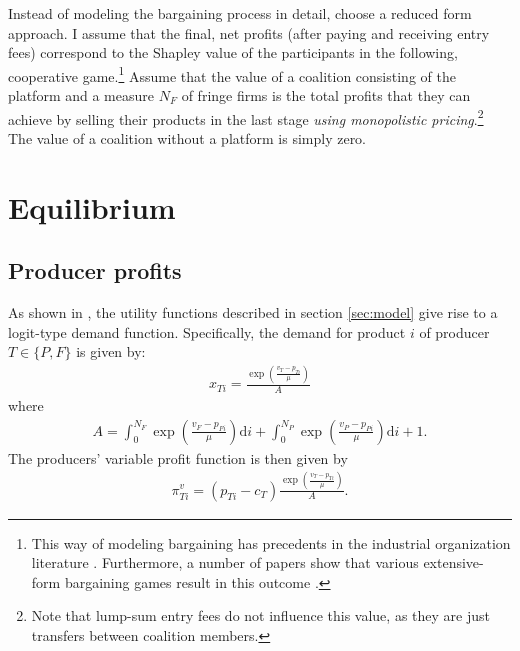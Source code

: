 \documentclass[a4paper]{article}
\newcommand{\di}{\mathrm{d}i}
\begin{document}
Instead of modeling the bargaining process in detail, choose a reduced form approach. I assume that the final, net profits (after paying and receiving entry fees) correspond to the Shapley value of the participants in the following, cooperative game.\footnote{
    This way of modeling bargaining has precedents in the industrial organization literature \parencite[e.g.][]{hart1990property,segal2003collusion,inderst2003bargaining,montez2007downstream}.
    Furthermore, a number of papers show that various extensive-form bargaining games result in this outcome \parencite{gul1989bargaining,winter1994demand,hart1996bargaining,inderst2003bargaining,stole1996intra}.
}
Assume that the value of a coalition consisting of the platform and a measure $N_F$ of fringe firms is the total profits that they can achieve by selling their products in the last stage \emph{using monopolistic pricing}.\footnote{
    Note that lump-sum entry fees do not influence this value, as they are just transfers between coalition members.
}
The value of a coalition without a platform is simply zero.


\section{Equilibrium}

\subsection{Producer profits}


As shown in \textcite[]{anderson2021hybrid}, the utility functions described in section \ref{sec:model} give rise to a logit-type demand function.
Specifically, the demand for product $i$ of producer $T \in \{P, F\}$ is given by:
\begin{align*}
    x_{Ti} = \frac{\exp\left( \frac{v_T - p_{Ti}}{\mu} \right)}{A}
\end{align*}
where
\begin{align}
    A = \int_0^{N_F} \exp\left( \frac{v_F - p_{Fi}}{\mu} \right) \di + \int_0^{N_P} \exp\left( \frac{v_P - p_{Pi}}{\mu} \right) \di + 1.
    \label{eq:aggregate}
\end{align}
The producers' variable profit function is then given by
\begin{align}
    \pi^v_{Ti} = ( p_{Ti} - c_T ) \frac{\exp\left( \frac{v_T - p_{Ti}}{\mu} \right)}{A}.
    \label{eq:variable_profit}
\end{align}
\end{document}
